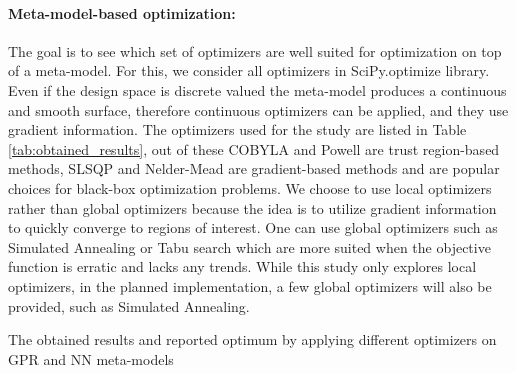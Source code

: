 \paragraph{Meta-model-based optimization:} The goal is to see which set of optimizers are well suited for optimization on top of a meta-model. For this, we consider all optimizers in SciPy.optimize \cite{2020SciPy-NMeth} library. Even if the design space is discrete valued the meta-model produces a continuous and smooth surface, therefore continuous optimizers can be applied, and they use gradient information. The optimizers used for the study are listed in Table \ref{tab:obtained_results}, out of these COBYLA and Powell are trust region-based methods, SLSQP and Nelder-Mead are gradient-based methods and are popular choices for black-box optimization problems. We choose to use local optimizers rather than global optimizers because the idea is to utilize gradient information to quickly converge to regions of interest. One can use global optimizers such as Simulated Annealing or Tabu search which are more suited when the objective function is erratic and lacks any trends. While this study only explores local optimizers, in the planned implementation, a few global optimizers will also be provided, such as Simulated Annealing. 
\begin{table}[!t]\centering \setlength{\tabcolsep}{2pt} \fontsize{7pt}{9pt}\selectfont
\caption{The obtained results and reported optimum by applying different optimizers on GPR and NN meta-models}\label{tab:obtained_results}

\end{table}

